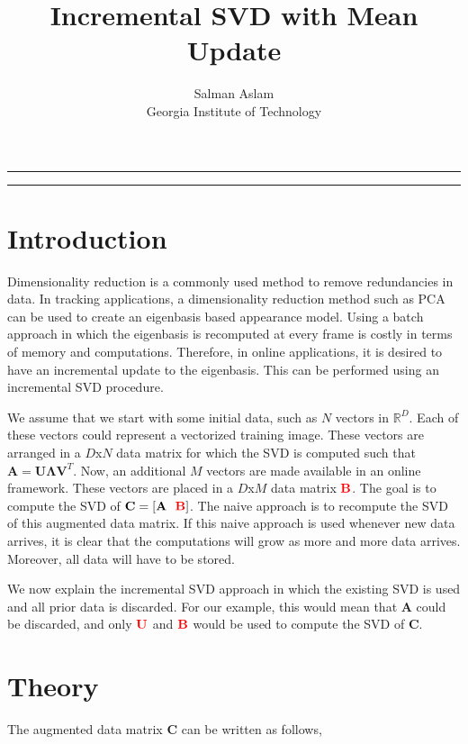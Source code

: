 
\title{Incremental SVD with Mean Update}
\author{Salman Aslam\\ Georgia Institute of Technology}

\maketitle
\rule[0pt]{\textwidth}{1pt}
\tableofcontents
\rule[0pt]{\textwidth}{1pt}
\section{Introduction}
Dimensionality reduction is a commonly used method to remove redundancies in data.  In tracking applications, a dimensionality reduction method such as PCA can be used to create an eigenbasis based appearance model.  Using a batch approach in which the eigenbasis is recomputed at every frame is costly in terms of memory and computations.  Therefore, in online applications, it is desired to have an incremental update to the eigenbasis.  This can be performed using an incremental SVD procedure.

We assume that we start with some initial data, such as $N$ vectors in $\mathbb{R}^D$.  Each of these vectors could represent a vectorized training image.  These vectors are arranged in a $D$x$N$ data matrix for which the SVD is computed such that $\mathbf{A}=\mathbf{U}\mathbf{\Lambda}\mathbf{V}^T$.  Now, an additional $M$ vectors are made available in an online framework.  These vectors are placed in a $D$x$M$ data matrix ${\color{red}\mathbf{B}}$.  The goal is to compute the SVD of $\mathbf{C} = [\mathbf{A} \ \ {\color{red}\mathbf{B}}]$.  The naive approach is to recompute the SVD of this augmented data matrix.  If this naive approach is used whenever new data arrives, it is clear that the computations will grow as more and more data arrives.  Moreover, all data will have to be stored.

We now explain the incremental SVD approach in which the existing SVD is used and all prior data is discarded.  For our example, this would mean that $\mathbf{A}$ could be discarded, and only ${\color{red}\mathbf{U}}$ and ${\color{red}\mathbf{B}}$ would be used to compute the SVD of $\mathbf{C}$.

\section{Theory}
The augmented data matrix $\mathbf{C}$ can be written as follows,

